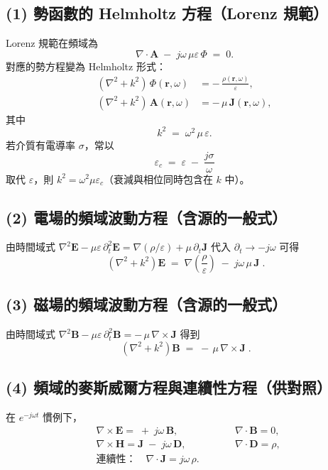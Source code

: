 \documentclass{article}
\begin{document}
\subsection*{(1) 勢函數的 Helmholtz 方程（Lorenz 規範）}
Lorenz 規範在頻域為
\[
\nabla\!\cdot\!\mathbf{A} \;-\; j\omega\,\mu\varepsilon\,\Phi \;=\; 0.
\]
對應的勢方程變為 Helmholtz 形式：
\begin{align}
\left(\nabla^2 + k^2\right)\,\Phi(\mathbf{r},\omega) &= -\,\frac{\rho(\mathbf{r},\omega)}{\varepsilon}, \label{eq:Phi_helm}\\[4pt]
\left(\nabla^2 + k^2\right)\,\mathbf{A}(\mathbf{r},\omega) &= -\,\mu\,\mathbf{J}(\mathbf{r},\omega), \label{eq:A_helm}
\end{align}
其中
\[
k^2 \;=\; \omega^2\,\mu\,\varepsilon.
\]
若介質有電導率 $\sigma$，常以
\[
\varepsilon_c \;=\; \varepsilon \;-\; \frac{j\sigma}{\omega}
\]
取代 $\varepsilon$，則 $k^2=\omega^2\mu\varepsilon_c$（衰減與相位同時包含在 $k$ 中）。

\subsection*{(2) 電場的頻域波動方程（含源的一般式）}
由時間域式
\(
\nabla^2\mathbf{E}-\mu\varepsilon\,\partial_t^2\mathbf{E}
=\nabla(\rho/\varepsilon)+\mu\,\partial_t\mathbf{J}
\)
代入 $\partial_t\to -j\omega$ 可得
\begin{equation}
\boxed{\;
\left(\nabla^2 + k^2\right)\mathbf{E}
\;=\;
\nabla\!\left(\frac{\rho}{\varepsilon}\right)
\;-\; j\omega\,\mu\,\mathbf{J}
\;}.
\label{eq:E_helm}
\end{equation}

\subsection*{(3) 磁場的頻域波動方程（含源的一般式）}
由時間域式
\(
\nabla^2\mathbf{B}-\mu\varepsilon\,\partial_t^2\mathbf{B}
=-\,\mu\,\nabla\times\mathbf{J}
\)
得到
\begin{equation}
\boxed{\;
\left(\nabla^2 + k^2\right)\mathbf{B}
\;=\;
-\,\mu\,\nabla\times\mathbf{J}
\;}.
\label{eq:B_helm}
\end{equation}

\subsection*{(4) 頻域的麥斯威爾方程與連續性方程（供對照）}
在 $e^{-j\omega t}$ 慣例下，
\[
\begin{aligned}
&\nabla\times\mathbf{E} = \;+\; j\omega\,\mathbf{B}, 
&&\qquad \nabla\cdot\mathbf{B}=0,\\
&\nabla\times\mathbf{H} = \mathbf{J} \;-\; j\omega\,\mathbf{D},
&&\qquad \nabla\cdot\mathbf{D}=\rho,\\
&\text{連續性：}\quad \nabla\cdot\mathbf{J} = j\omega\,\rho.
\end{aligned}
\]
\end{document}
